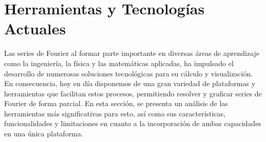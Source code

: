 \section{Herramientas y Tecnologías Actuales}
Las series de Fourier al formar parte importante en diversas áreas de aprendizaje como la ingeniería, la física y las matemáticas aplicadas, ha impulsado el desarrollo de numerosas soluciones tecnológicas para su cálculo y visualización. En consecuencia, hoy en día disponemos de una gran variedad de plataformas y herramientas que facilitan estos procesos, permitiendo resolver y graficar series de Fourier de forma parcial. En esta sección, se presenta un análisis de las herramientas más significativas para esto, así como sus características, funcionalidades y limitaciones en cuanto a la  incorporación de ambas capacidades en una única plataforma.

